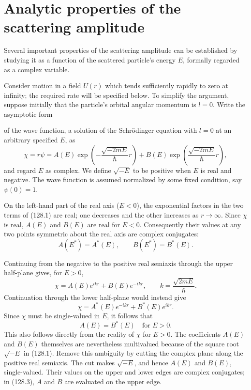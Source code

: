 \section{Analytic properties of the scattering amplitude}

Several important properties of the scattering amplitude can be established
by studying it as a function of the scattered particle's energy $E$, formally
regarded as a complex variable.

Consider motion in a field $U(r)$ which tends sufficiently rapidly to zero at
infinity; the required rate will be specified below. To simplify the argument,
suppose initially that the particle's orbital angular momentum is $l=0$. Write
the asymptotic form

of the wave function, a solution of the Schrödinger equation with $l=0$ at an
arbitrary specified $E$, as
\begin{equation}
 \chi=r\psi=A(E)\exp\left(-\frac{\sqrt{-2mE}}{\hbar}r\right)
 +B(E)\exp\left(\frac{\sqrt{-2mE}}{\hbar}r\right),
 \tag{128.1}
\end{equation}
and regard $E$ as complex. We define $\sqrt{-E}$ to be positive when $E$ is
real and negative. The wave function is assumed normalized by some fixed
condition, say $\psi(0)=1$.

On the left-hand part of the real axis ($E<0$), the exponential factors in the
two terms of (128.1) are real; one decreases and the other increases as
$r\to\infty$. Since $\chi$ is real, $A(E)$ and $B(E)$ are real for $E<0$.
Consequently their values at any two points symmetric about the real axis are
complex conjugates:
\begin{equation}
 A(E^*)=A^*(E),\qquad B(E^*)=B^*(E).
 \tag{128.2}
\end{equation}

Continuing from the negative to the positive real semiaxis through the upper
half-plane gives, for $E>0$,
\begin{equation}
 \chi=A(E)e^{ikr}+B(E)e^{-ikr},\qquad k=\frac{\sqrt{2mE}}{\hbar}.
 \tag{128.3}
\end{equation}
Continuation through the lower half-plane would instead give
\[
 \chi=A^*(E)e^{-ikr}+B^*(E)e^{ikr}.
\]
Since $\chi$ must be single-valued in $E$, it follows that
\begin{equation}
 A(E)=B^*(E)\quad\text{for }E>0.
 \tag{128.4}
\end{equation}
This also follows directly from the reality of $\chi$ for $E>0$. The
coefficients $A(E)$ and $B(E)$ themselves are nevertheless multivalued because
of the square root $\sqrt{-E}$ in (128.1). Remove this ambiguity by cutting the
complex plane along the positive real semiaxis. The cut makes $\sqrt{-E}$, and
hence $A(E)$ and $B(E)$, single-valued. Their values on the upper and lower
edges are complex conjugates; in (128.3), $A$ and $B$ are evaluated on the
upper edge.

